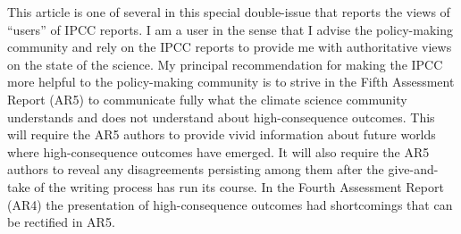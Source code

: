 This article is one of several in this special double-issue that reports the views of “users” of IPCC reports. I am a user in the sense that I advise the policy-making community and rely on the IPCC reports to provide me with authoritative views on the state of the science. My principal recommendation for making the IPCC more helpful to the policy-making community is to strive in the Fifth Assessment Report (AR5) to communicate fully what the climate science community understands and does not understand about high-consequence outcomes. This will require the AR5 authors to provide vivid information about future worlds where high-consequence outcomes have emerged. It will also require the AR5 authors to reveal any disagreements persisting among them after the give-and-take of the writing process has run its course. In the Fourth Assessment Report (AR4) the presentation of high-consequence outcomes had shortcomings that can be rectified in AR5.
